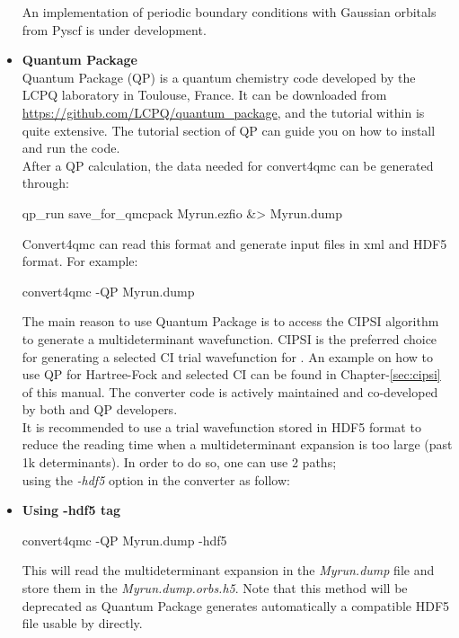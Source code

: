 \begin{itemize}
\begin{itemize}
\end{itemize}

 An implementation of periodic boundary conditions with Gaussian orbitals from Pyscf is under development. 

\item \textbf{Quantum Package}\\
Quantum Package\cite{QP} (QP) is a quantum chemistry code developed by the LCPQ laboratory in Toulouse, France. It can be downloaded from \url{https://github.com/LCPQ/quantum_package}, and the tutorial within is quite extensive. The tutorial section of QP can guide you on how to install and run the code.\\
After a QP calculation, the data needed for convert4qmc can be generated through:\\
\begin{shade}
 qp_run save_for_qmcpack Myrun.ezfio &> Myrun.dump
\end{shade}

Convert4qmc can read this format and generate \qmcpack input files in xml and HDF5 format.  For example:

\begin{shade}
 convert4qmc -QP Myrun.dump
\end{shade}


The main reason to use Quantum Package is to access the CIPSI algorithm to generate a multideterminant wavefunction.
CIPSI is the preferred choice for generating a selected CI trial wavefunction for \qmcpack.
An example on how to use QP for Hartree-Fock and selected CI can be found in Chapter-\ref{sec:cipsi}  of this manual.
The converter code is actively maintained and co-developed by both \qmcpack and QP developers.\\

It is recommended to use a trial wavefunction stored in HDF5 format to reduce the reading time when a multideterminant expansion is too large (past 1k determinants). In order to do so, one can use 2 paths;\\
using the \textit{-hdf5} option in the converter as follow:\\

 \item \textbf{Using -hdf5 tag}\\

\begin{shade}
 convert4qmc -QP Myrun.dump -hdf5
\end{shade}

This will read the multideterminant expansion in the \textit{Myrun.dump} file and store them in the \textit{Myrun.dump.orbs.h5}. Note that this method will be deprecated as Quantum Package generates automatically a compatible HDF5 file usable by \qmcpack directly. \\


\end{itemize}
